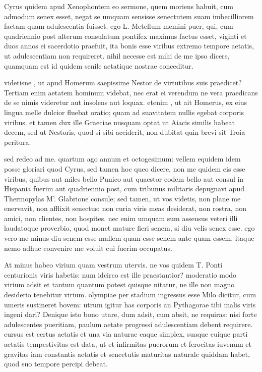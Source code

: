  Cyrus quidem apud Xenophontem eo sermone, quem moriens habuit, cum admodum senex esset, negat se umquam sensisse senectutem suam imbecilliorem factam quam adulescentia fuisset. ego L. Metellum memini puer, qui, cum quadriennio post alterum consulatum pontifex maximus factus esset, viginti et duos annos ei sacerdotio praefuit, ita bonis esse viribus extremo tempore aetatis, ut adulescentiam non requireret. nihil necesse est mihi de me ipso dicere, quamquam est id quidem senile aetatique nostrae conceditur.

 videtisne , ut apud Homerum saepissime Nestor de virtutibus suis praedicet? Tertiam enim aetatem hominum videbat, nec erat ei verendum ne vera praedicans de se nimis videretur aut insolens aut loquax. etenim , ut ait Homerus, ex eius lingua melle dulcior fluebat oratio; quam ad suavitatem nullis egebat corporis viribus. et tamen dux ille Graeciae nusquam optat ut Aiacis similis habeat decem, sed ut Nestoris, quod si sibi acciderit, non dubitat quin brevi sit Troia peritura.

 sed redeo ad me. quartum ago annum et octogesimum: vellem equidem idem posse gloriari quod Cyrus, sed tamen hoc queo dicere, non me quidem eis esse viribus, quibus aut miles bello Punico aut quaestor eodem bello aut consul in Hispania fuerim aut quadriennio post, cum tribunus militaris depugnavi apud Thermopylas M'. Glabrione consule; sed tamen, ut vos videtis, non plane me enervavit, non afflixit senectus: non curia viris meas desiderat, non rostra, non amici, non clientes, non hospites. nec enim umquam sum assensus veteri illi laudatoque proverbio, quod monet mature fieri senem, si diu velis senex esse. ego vero me minus diu senem esse mallem quam esse senem ante quam essem. itaque nemo adhuc convenire me voluit cui fuerim occupatus.

 At minus habeo virium quam vestrum utervis. ne vos quidem T. Ponti centurionis viris habetis: num idcirco est ille praestantior? moderatio modo virium adsit et tantum quantum potest quisque nitatur, ne ille non magno desiderio tenebitur virium. olympiae per stadium ingressus esse Milo dicitur, cum umeris sustineret bovem: utrum igitur has corporis an Pythagorae tibi malis viris ingeni dari? Denique isto bono utare, dum adsit, cum absit, ne requiras: nisi forte adulescentes pueritiam, paulum aetate progressi adulescentiam debent requirere. cursus est certus aetatis et una via naturae eaque simplex, suaque cuique parti aetatis tempestivitas est data, ut et infirmitas puerorum et ferocitas iuvenum et gravitas iam constantis aetatis et senectutis maturitas naturale quiddam habet, quod suo tempore percipi debeat.

